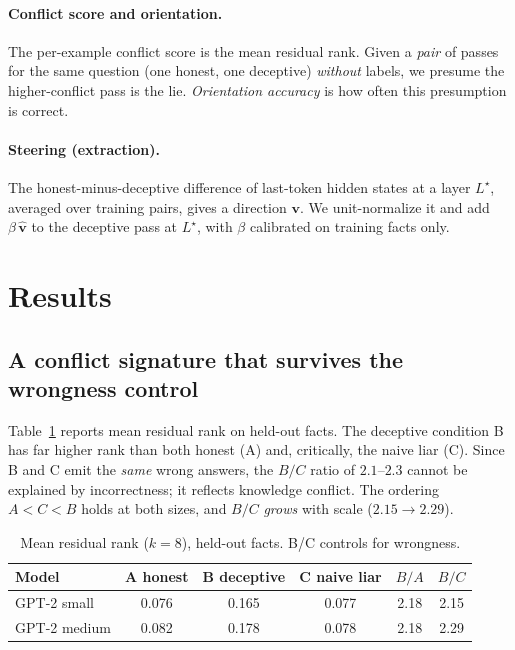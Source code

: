 \documentclass[11pt]{article}
\begin{document}
\paragraph{Conflict score and orientation.} The per-example conflict score is the
mean residual rank. Given a \emph{pair} of passes for the same question (one
honest, one deceptive) \emph{without} labels, we presume the higher-conflict pass
is the lie. \emph{Orientation accuracy} is how often this presumption is correct.

\paragraph{Steering (extraction).} The honest-minus-deceptive difference of
last-token hidden states at a layer $L^\star$, averaged over training pairs,
gives a direction $\mathbf{v}$. We unit-normalize it and add
$\beta\,\hat{\mathbf v}$ to the deceptive pass at $L^\star$, with $\beta$
calibrated on training facts only.

\section{Results}

\subsection{A conflict signature that survives the wrongness control}
\label{sec:rank}

Table~\ref{tab:rank} reports mean residual rank on held-out facts. The deceptive
condition B has far higher rank than both honest (A) and, critically, the naive
liar (C). Since B and C emit the \emph{same} wrong answers, the $B/C$ ratio of
$2.1$--$2.3$ cannot be explained by incorrectness; it reflects knowledge
conflict. The ordering $A < C < B$ holds at both sizes, and $B/C$ \emph{grows}
with scale ($2.15\to2.29$).

\begin{table}[h]
\centering
\caption{Mean residual rank ($k{=}8$), held-out facts. B/C controls for
wrongness.}
\label{tab:rank}
\begin{tabular}{lccccc}
\toprule
Model & A honest & B deceptive & C naive liar & $B/A$ & $B/C$\\
\midrule
GPT-2 small  & 0.076 & 0.165 & 0.077 & 2.18 & 2.15\\
GPT-2 medium & 0.082 & 0.178 & 0.078 & 2.18 & 2.29\\
\bottomrule
\end{tabular}
\end{table}
\end{document}
